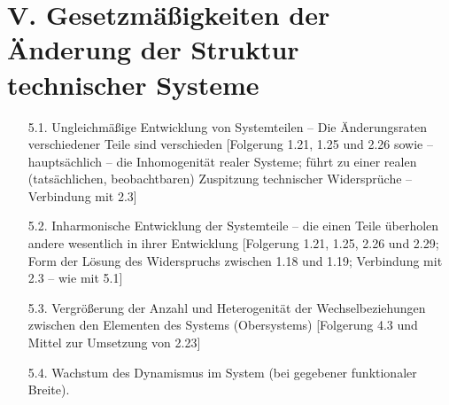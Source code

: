 \documentclass[11pt,a4paper]{article}
\begin{document}
\section*{V. Gesetzmäßigkeiten der Änderung der Struktur\\ technischer
  Systeme} 
\begin{itemize}
\item[5.1.] Ungleichmäßige Entwicklung von Systemteilen -- Die Änderungsraten
  verschiedener Teile sind verschieden [Folgerung 1.21, 1.25 und 2.26 sowie --
    hauptsächlich -- die Inhomogenität realer Systeme; führt zu einer realen
    (tatsächlichen, beobachtbaren) Zuspitzung technischer Widersprüche --
    Verbindung mit 2.3]
\item[5.2.] Inharmonische Entwicklung der Systemteile -- die einen Teile
  überholen andere wesentlich in ihrer Entwicklung [Folgerung 1.21, 1.25, 2.26
    und 2.29; Form der Lösung des Widerspruchs zwischen 1.18 und 1.19;
    Verbindung mit 2.3 -- wie mit 5.1]
\item[5.3.] Vergrößerung der Anzahl und Heterogenität der Wechselbeziehungen
  zwischen den Elementen des Systems (Obersystems) [Folgerung 4.3 und Mittel
    zur Umsetzung von 2.23]
\item[5.4.] Wachstum des Dynamismus im System (bei gegebener funktionaler
  Breite).


\end{itemize}
\end{document}
